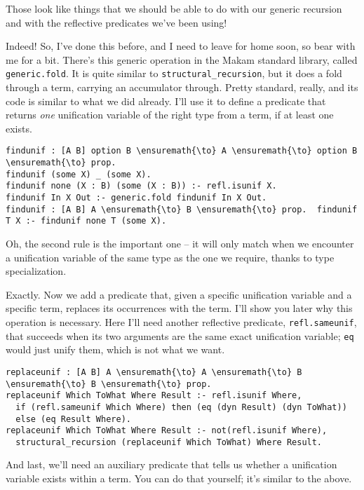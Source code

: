 \noindent
Those look like things that we should be able to do with our generic
recursion and with the reflective predicates we've been using!

\heroADVISOR{} Indeed! So, I've done this before, and I need to leave for home
soon, so bear with me for a bit. There's this generic operation in the
Makam standard library, called \texttt{generic.fold}. It is quite
similar to \texttt{structural\_recursion}, but it does a fold through a
term, carrying an accumulator through. Pretty standard, really, and its
code is similar to what we did already. I'll use it to define a
predicate that returns \emph{one} unification variable of the right type
from a term, if at least one exists.

\begin{verbatim}
findunif : [A B] option B \ensuremath{\to} A \ensuremath{\to} option B \ensuremath{\to} prop.
findunif (some X) _ (some X).
findunif none (X : B) (some (X : B)) :- refl.isunif X.
findunif In X Out :- generic.fold findunif In X Out.
findunif : [A B] A \ensuremath{\to} B \ensuremath{\to} prop.  findunif T X :- findunif none T (some X).
\end{verbatim}

\heroSTUDENT{} Oh, the second rule is the important one -- it will only match
when we encounter a unification variable of the same type as the one we
require, thanks to type specialization.

\heroADVISOR{} Exactly. Now we add a predicate that, given a specific
unification variable and a specific term, replaces its occurrences with
the term. I'll show you later why this operation is necessary. Here I'll
need another reflective predicate, \texttt{refl.sameunif}, that succeeds
when its two arguments are the same exact unification variable;
\texttt{eq} would just unify them, which is not what we want.

\begin{verbatim}
replaceunif : [A B] A \ensuremath{\to} A \ensuremath{\to} B \ensuremath{\to} B \ensuremath{\to} prop.
replaceunif Which ToWhat Where Result :- refl.isunif Where,
  if (refl.sameunif Which Where) then (eq (dyn Result) (dyn ToWhat))
  else (eq Result Where).
replaceunif Which ToWhat Where Result :- not(refl.isunif Where),
  structural_recursion (replaceunif Which ToWhat) Where Result.
\end{verbatim}

\heroADVISOR{} And last, we'll need an auxiliary predicate that tells us
whether a unification variable exists within a term. You can do that
yourself; it's similar to the above.


